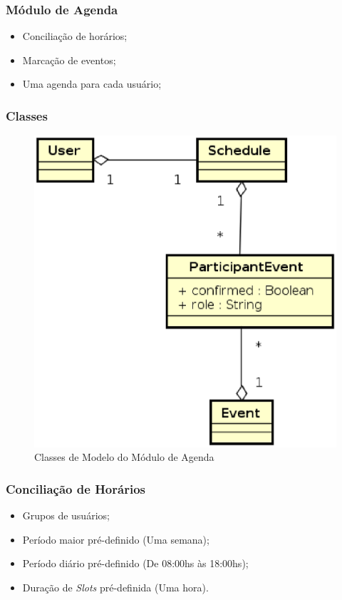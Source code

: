 \documentclass{beamer}
\begin{document}
\begin{frame}
\frametitle{Módulo de Agenda}

\begin{itemize}
	\item Conciliação de horários;
	\item Marcação de eventos;
	\item Uma agenda para cada usuário;
\end{itemize}

\end{frame}

\begin{frame}
\frametitle{Classes}

\begin{figure}[!h]
	\centering
	\includegraphics[scale=0.45]{figuras/modulo_agenda.eps}
	\caption{Classes de Modelo do Módulo de Agenda}
\end{figure}

\end{frame}

\begin{frame}
\frametitle{Conciliação de Horários}

\begin{itemize}
	\item Grupos de usuários;
	\item Período maior pré-definido (Uma semana);
	\item Período diário pré-definido (De 08:00hs às 18:00hs);
	\item Duração de \textit{Slots} pré-definida (Uma hora).
\end{itemize}

\end{frame}
\end{document}
